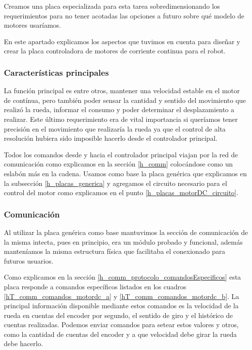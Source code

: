 Creamos una placa especializada para esta tarea sobredimensionando los requerimientos para no tener acotadas las opciones
a futuro sobre qu\'e modelo de motores usar\'iamos.

En este apartado explicamos los aspectos que tuvimos en cuenta para dise\~nar y crear la placa controladora de motores
de corriente continua para el robot.

\subsubsection{Caracter\'isticas principales}
\label{h_placas_motorDC_caracteristicas}

La funci\'on principal es entre otros, mantener una velocidad estable en el motor de cont\'inua, pero tambi\'en poder sensar la cantidad
y sentido del movimiento que realiz\'o la rueda, informar el consumo y poder determinar el desplazamiento a realizar.
Este \'ultimo requerimiento era de vital importancia si quer\'iamos tener precisi\'on en el movimiento que realizar\'ia la rueda
ya que el control de alta resoluci\'on hubiera sido imposible hacerlo desde el controlador principal.

Todos los comandos desde y hacia el controlador principal viajan por la red de comunicaci\'on como explicamos en la secci\'on
\ref{h_comm} coloc\'andose como un eslab\'on m\'as en la cadena.
Usamos como base la placa gen\'erica que explicamos en la subsecci\'on \ref{h_placas_generica} y agregamos el circuito necesario para
el control del motor como explicamos en el punto \ref{h_placas_motorDC_circuito}.

\subsubsection{Comunicaci\'on}
\label{h_placas_motorDC_comm}

Al utilizar la placa gen\'erica como base mantuvimos la secci\'on de comunicaci\'on de la misma intecta, pues
en principio, era un m\'odulo probado y funcional, adem\'as manten\'iamos la misma estructura f\'isica que
facilitaba el conexionado para futuros usuarios.

Como explicamos en la secci\'on \ref{h_comm_protocolo_comandosEspecificos} esta placa responde a comandos
espec\'ificos listados en los cuadros \ref{hT_comm_comandos_motordc_a} y  \ref{hT_comm_comandos_motordc_b}.
La principal informaci\'on disponible mediante estos comandos es la velocidad de la rueda en cuentas del
encoder por segundo, el sentido de giro y el hist\'orico de cuentas realizadas.
Podemos enviar comandos para setear estos valores y otros, como la cantidad de cuentas del encoder y a que
velocidad debe girar la rueda debe hacerlo.

